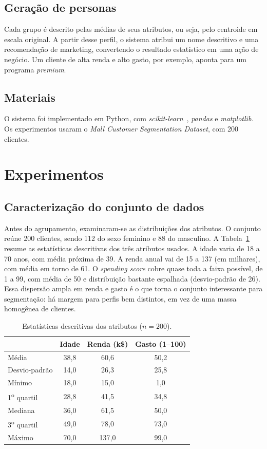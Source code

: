\documentclass[conference]{IEEEtran}
\begin{document}
\subsection{Gera\c{c}\~ao de personas}
Cada grupo \'e descrito pelas m\'edias de seus atributos, ou seja, pelo centroide em escala original. A partir desse perfil, o sistema atribui um nome descritivo e uma recomenda\c{c}\~ao de marketing, convertendo o resultado estat\'istico em uma a\c{c}\~ao de neg\'ocio. Um cliente de alta renda e alto gasto, por exemplo, aponta para um programa \textit{premium}.

\subsection{Materiais}
O sistema foi implementado em Python, com \textit{scikit-learn}~\cite{pedregosa2011}, \textit{pandas} e \textit{matplotlib}. Os experimentos usaram o \textit{Mall Customer Segmentation Dataset}, com 200 clientes.

\section{Experimentos}
\subsection{Caracteriza\c{c}\~ao do conjunto de dados}
Antes do agrupamento, examinaram-se as distribui\c{c}\~oes dos atributos. O conjunto re\'une 200 clientes, sendo 112 do sexo feminino e 88 do masculino. A Tabela~\ref{tab:desc} resume as estat\'isticas descritivas dos tr\^es atributos usados. A idade varia de 18 a 70 anos, com m\'edia pr\'oxima de 39. A renda anual vai de 15 a 137 (em milhares), com m\'edia em torno de 61. O \textit{spending score} cobre quase toda a faixa poss\'ivel, de 1 a 99, com m\'edia de 50 e distribui\c{c}\~ao bastante espalhada (desvio-padr\~ao de 26). Essa dispers\~ao ampla em renda e gasto \'e o que torna o conjunto interessante para segmenta\c{c}\~ao: h\'a margem para perfis bem distintos, em vez de uma massa homog\^enea de clientes.

\begin{table}[t]
\caption{Estat\'isticas descritivas dos atributos ($n=200$).}
\label{tab:desc}
\centering
\small
\begin{tabular}{lccc}
\toprule
 & Idade & Renda (k\$) & Gasto (1--100) \\
\midrule
M\'edia & 38{,}8 & 60{,}6 & 50{,}2 \\
Desvio-padr\~ao & 14{,}0 & 26{,}3 & 25{,}8 \\
M\'inimo & 18{,}0 & 15{,}0 & 1{,}0 \\
1\textsuperscript{o} quartil & 28{,}8 & 41{,}5 & 34{,}8 \\
Mediana & 36{,}0 & 61{,}5 & 50{,}0 \\
3\textsuperscript{o} quartil & 49{,}0 & 78{,}0 & 73{,}0 \\
M\'aximo & 70{,}0 & 137{,}0 & 99{,}0 \\
\bottomrule
\end{tabular}
\end{table}
\end{document}
